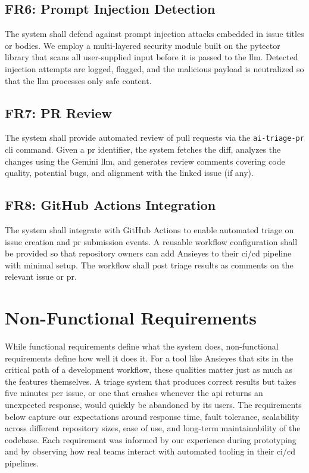 \subsection{FR6: Prompt Injection Detection}

The system shall defend against prompt injection attacks embedded in issue titles or bodies. We employ a multi-layered security module built on the pytector library that scans all user-supplied input before it is passed to the \gls{llm}. Detected injection attempts are logged, flagged, and the malicious payload is neutralized so that the \gls{llm} processes only safe content.

\subsection{FR7: PR Review}

The system shall provide automated review of pull requests via the \texttt{ai-triage-pr} \gls{cli} command. Given a \gls{pr} identifier, the system fetches the diff, analyzes the changes using the Gemini \gls{llm}, and generates review comments covering code quality, potential bugs, and alignment with the linked issue (if any).

\subsection{FR8: GitHub Actions Integration}

The system shall integrate with GitHub Actions to enable automated triage on issue creation and \gls{pr} submission events. A reusable workflow configuration shall be provided so that repository owners can add Ansieyes to their \gls{ci}/\gls{cd} pipeline with minimal setup. The workflow shall post triage results as comments on the relevant issue or \gls{pr}.

\section{Non-Functional Requirements}

While functional requirements define what the system does, non-functional requirements define how well it does it. For a tool like Ansieyes that sits in the critical path of a development workflow, these qualities matter just as much as the features themselves. A triage system that produces correct results but takes five minutes per issue, or one that crashes whenever the \gls{api} returns an unexpected response, would quickly be abandoned by its users. The requirements below capture our expectations around response time, fault tolerance, scalability across different repository sizes, ease of use, and long-term maintainability of the codebase. Each requirement was informed by our experience during prototyping and by observing how real teams interact with automated tooling in their \gls{ci}/\gls{cd} pipelines.

